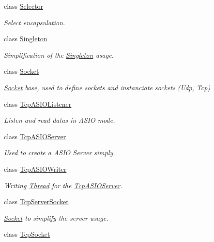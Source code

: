 \begin{DoxyCompactItemize}
class \hyperlink{classmognetwork_1_1_selector}{Selector}
\begin{DoxyCompactList}\small\item\em Select encapsulation. \end{DoxyCompactList}\item 
class \hyperlink{classmognetwork_1_1_singleton}{Singleton}
\begin{DoxyCompactList}\small\item\em Simplification of the \hyperlink{classmognetwork_1_1_singleton}{Singleton} usage. \end{DoxyCompactList}\item 
class \hyperlink{classmognetwork_1_1_socket}{Socket}
\begin{DoxyCompactList}\small\item\em \hyperlink{classmognetwork_1_1_socket}{Socket} base, used to define sockets and instanciate sockets (Udp, Tcp) \end{DoxyCompactList}\item 
class \hyperlink{classmognetwork_1_1_tcp_a_s_i_o_listener}{Tcp\-A\-S\-I\-O\-Listener}
\begin{DoxyCompactList}\small\item\em Listen and read datas in A\-S\-I\-O mode. \end{DoxyCompactList}\item 
class \hyperlink{classmognetwork_1_1_tcp_a_s_i_o_server}{Tcp\-A\-S\-I\-O\-Server}
\begin{DoxyCompactList}\small\item\em Used to create a A\-S\-I\-O Server simply. \end{DoxyCompactList}\item 
class \hyperlink{classmognetwork_1_1_tcp_a_s_i_o_writer}{Tcp\-A\-S\-I\-O\-Writer}
\begin{DoxyCompactList}\small\item\em Writing \hyperlink{classmognetwork_1_1_thread}{Thread} for the \hyperlink{classmognetwork_1_1_tcp_a_s_i_o_server}{Tcp\-A\-S\-I\-O\-Server}. \end{DoxyCompactList}\item 
class \hyperlink{classmognetwork_1_1_tcp_server_socket}{Tcp\-Server\-Socket}
\begin{DoxyCompactList}\small\item\em \hyperlink{classmognetwork_1_1_socket}{Socket} to simplify the server usage. \end{DoxyCompactList}\item 
class \hyperlink{classmognetwork_1_1_tcp_socket}{Tcp\-Socket}

\end{DoxyCompactItemize}
